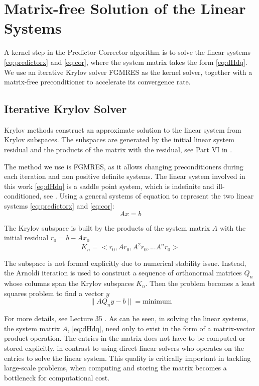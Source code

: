 \documentclass{article}
\theoremstyle{definition}
\begin{document}
\section{Matrix-free Solution of the Linear Systems}
A kernel step in the Predictor-Corrector algorithm is to solve the linear systems \eqref{eq:predictorx} and \eqref{eq:cor}, where the system matrix takes the form \eqref{eq:dHdq}. We use an iterative Krylov solver FGMRES as the kernel solver, together with a matrix-free preconditioner to accelerate its convergence rate. 
\subsection{Iterative Krylov Solver}
Krylov methods construct an approximate solution to the linear system from Krylov subspaces. The subspaces are generated by the initial linear system residual and the products of the matrix with the residual, see Part VI in \cite{trefethen1997numerical}.

The method we use is FGMRES, as it allows changing preconditioners during each iteration and non positive definite systems. The linear system involved in this work \eqref{eq:dHdq} is a saddle point system, which is indefinite and ill-conditioned, see \cite{benzi2005numerical,saddle_opt}. Using a general systems of equation to represent the two linear systems \eqref{eq:predictorx} and \eqref{eq:cor}:
\begin{equation}
Ax = b 
\end{equation}

The Krylov subspace is built by the products of the system matrix $A$ with the initial residual $r_0 = b - A x_0$
\begin{equation}
K_n = <r_0, Ar_0, A^2r_0, ... A^nr_0> 
\end{equation}

The subspace is not formed explicitly due to numerical stability issue. Instead, the Arnoldi iteration is used to construct a sequence of orthonormal matrices $Q_n$ whose columns span the Krylov subspaces $K_n$. Then the problem becomes a least squares problem to find a vector $y$ 
\begin{equation}
\lVert A Q_n y - b \rVert = \textrm{minimum}
\end{equation}

For more details, see Lecture 35 \cite{trefethen1997numerical}. As can be seen, in solving the linear systems, the system matrix $A$, \eqref{eq:dHdq}, need only to exist in the form of a matrix-vector product operation. The entries in the matrix does not have to be computed or stored explicitly, in contrast to using direct linear solvers who operates on the entries to solve the linear system. This quality is critically important in tackling large-scale problems, when computing and storing the matrix becomes a bottleneck for computational cost. 
\end{document}
